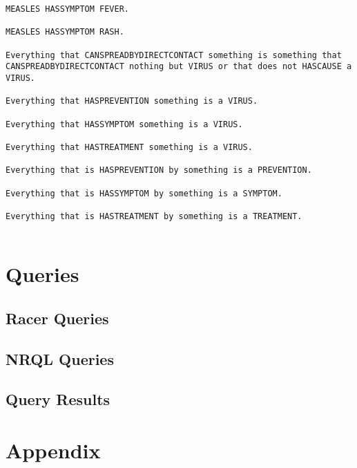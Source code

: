 \documentclass[a4paper,12pt]{report}
\begin{document}
\begin{lstlisting}
MEASLES HASSYMPTOM FEVER.

MEASLES HASSYMPTOM RASH.

Everything that CANSPREADBYDIRECTCONTACT something is something that CANSPREADBYDIRECTCONTACT nothing but VIRUS or that does not HASCAUSE a VIRUS.

Everything that HASPREVENTION something is a VIRUS.

Everything that HASSYMPTOM something is a VIRUS.

Everything that HASTREATMENT something is a VIRUS.

Everything that is HASPREVENTION by something is a PREVENTION.

Everything that is HASSYMPTOM by something is a SYMPTOM.

Everything that is HASTREATMENT by something is a TREATMENT.


\end{lstlisting}

\chapter{Queries}
\section{Racer Queries}
\begin{center}
\end{center}
\section{NRQL Queries}
\begin{center}
\end{center}
\section{Query Results}
\begin{center}
\end{center}
\begin{center}
\end{center}

\chapter{Appendix}
\appendix
\end{document}

